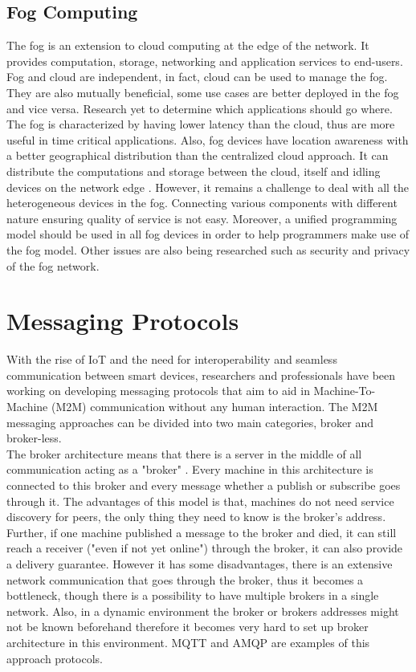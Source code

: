 \subsection{Fog Computing}

The fog is an extension to cloud computing at the edge of the network. It provides computation, storage, networking and application services to end-users. Fog and cloud are independent, in fact, cloud can be used to manage the fog. They are also mutually beneficial, some use cases are better deployed in the fog and vice versa. Research yet to determine which applications should go where. The fog is characterized by having lower latency than the cloud, thus are more useful in time critical applications. Also, fog devices have location awareness with a better geographical distribution than the centralized cloud approach. It can distribute the computations and storage between the cloud, itself and idling devices on the network edge \cite{7498684}. However, it remains a challenge to deal with all the heterogeneous devices in the fog. Connecting various components with different nature ensuring quality of service is not easy. Moreover, a unified programming model should be used in all fog devices in order to help programmers make use of the fog model. Other issues are also being researched such as security and privacy of the fog network\cite{Yi:2015:SFC:2757384.2757397}. 



\section{ Messaging Protocols}
With the rise of IoT and the need for interoperability and seamless communication between smart devices, researchers and professionals have been working on developing messaging protocols that aim to aid in Machine-To-Machine (M2M) communication without any human interaction. The M2M messaging approaches can be divided into two main categories, broker and broker-less.\\

\noindent The broker architecture means that there is a server in the middle of all communication acting as a "broker" . Every machine in this architecture is connected to this broker and every message whether a publish or subscribe goes through it. The advantages of this model is that, machines do not need service discovery for peers, the only thing they need to know is the broker's address. Further, if one machine published a message to the broker and died, it can still reach a receiver ("even if not yet online") through the broker, it can also provide a delivery guarantee. However it has some disadvantages,  there is an extensive network communication that goes through the broker, thus it becomes a bottleneck, though there is a possibility to have multiple brokers in a single network.  Also, in a dynamic environment the broker or brokers addresses might not be known beforehand therefore it becomes very hard to set up broker architecture in this environment. MQTT \cite{mqtt} and AMQP \cite{amqp} are examples of this approach protocols.\\

